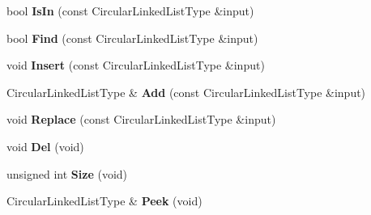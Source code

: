 \begin{DoxyCompactItemize}
\item 
\hypertarget{class_data_structures_1_1_circular_linked_list_afaac868df2c498af8929c755161d3d2c}{bool {\bfseries Is\-In} (const Circular\-Linked\-List\-Type \&input)}\label{class_data_structures_1_1_circular_linked_list_afaac868df2c498af8929c755161d3d2c}

\item 
\hypertarget{class_data_structures_1_1_circular_linked_list_a42ed315ec6b27947c5c162f8ec67cb77}{bool {\bfseries Find} (const Circular\-Linked\-List\-Type \&input)}\label{class_data_structures_1_1_circular_linked_list_a42ed315ec6b27947c5c162f8ec67cb77}

\item 
\hypertarget{class_data_structures_1_1_circular_linked_list_ae9f34d88cfb215008cda148c80ca1b94}{void {\bfseries Insert} (const Circular\-Linked\-List\-Type \&input)}\label{class_data_structures_1_1_circular_linked_list_ae9f34d88cfb215008cda148c80ca1b94}

\item 
\hypertarget{class_data_structures_1_1_circular_linked_list_af77041c880bfedbbb16afe1482c4ccd6}{Circular\-Linked\-List\-Type \& {\bfseries Add} (const Circular\-Linked\-List\-Type \&input)}\label{class_data_structures_1_1_circular_linked_list_af77041c880bfedbbb16afe1482c4ccd6}

\item 
\hypertarget{class_data_structures_1_1_circular_linked_list_aa94e608de8060f2ee02c9e3984545142}{void {\bfseries Replace} (const Circular\-Linked\-List\-Type \&input)}\label{class_data_structures_1_1_circular_linked_list_aa94e608de8060f2ee02c9e3984545142}

\item 
\hypertarget{class_data_structures_1_1_circular_linked_list_a9c2f0f72166f49c62e99aa58f7ee19b5}{void {\bfseries Del} (void)}\label{class_data_structures_1_1_circular_linked_list_a9c2f0f72166f49c62e99aa58f7ee19b5}

\item 
\hypertarget{class_data_structures_1_1_circular_linked_list_acbd6339fc68ed1015b6811a20ee39910}{unsigned int {\bfseries Size} (void)}\label{class_data_structures_1_1_circular_linked_list_acbd6339fc68ed1015b6811a20ee39910}

\item 
\hypertarget{class_data_structures_1_1_circular_linked_list_a81644887456b6966c3bb882a1a1557d0}{Circular\-Linked\-List\-Type \& {\bfseries Peek} (void)}\label{class_data_structures_1_1_circular_linked_list_a81644887456b6966c3bb882a1a1557d0}


\end{DoxyCompactItemize}
